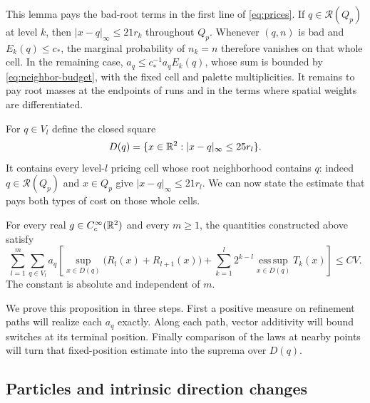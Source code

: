 This lemma pays the bad-root terms in the first line of
\eqref{eq:prices}. If $q\in\mathcal R(Q_p)$ at level $k$, then
$|x-q|_\infty\le21r_k$ throughout $Q_p$. Whenever $(q,n)$ is bad
and $E_k(q)\le c_*$, the marginal probability of $n_k=n$ therefore
vanishes on that whole cell. In the remaining case,
$a_q\le c_*^{-1}a_qE_k(q)$, whose sum is bounded by
\eqref{eq:neighbor-budget}, with the fixed cell and palette
multiplicities. It remains to pay root masses at the endpoints of
runs and in the terms where spatial weights are differentiated.

For $q\in V_l$ define the closed square
\[
 D(q)=\{x\in\mathbb R^2:|x-q|_\infty\le25r_l\}.
\]
It contains every level-$l$ pricing cell whose root neighborhood
contains $q$: indeed $q\in\mathcal R(Q_p)$ and $x\in Q_p$ give
$|x-q|_\infty\le21r_l$. We can now state the estimate that pays both
types of cost on those whole cells.

\begin{proposition}
\label{prop:label-packing}
For every real $g\in C_c^\infty(\mathbb R^2)$ and every $m\ge1$, the
quantities constructed above satisfy
\begin{equation}
 \sum_{l=1}^m\sum_{q\in V_l}a_q
 \left[
   \sup_{x\in D(q)}\bigl(R_l(x)+R_{l+1}(x)\bigr)
   +\sum_{k=1}^l2^{k-l}
       \operatorname*{ess\,sup}_{x\in D(q)}T_k(x)
 \right]
 \le C V.
 \label{eq:label-packing}
\end{equation}
The constant is absolute and independent of $m$.
\end{proposition}

We prove this proposition in three steps. First a positive measure
on refinement paths will realize each $a_q$ exactly. Along each path,
vector additivity will bound switches at its terminal position.
Finally comparison of the laws at nearby points will turn that
fixed-position estimate into the suprema over $D(q)$.

\subsection{Particles and intrinsic direction changes}

